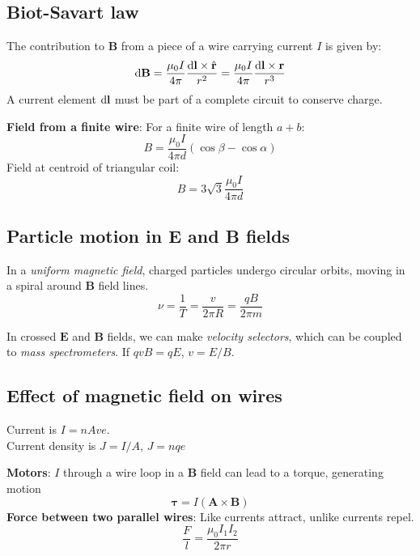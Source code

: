 \subsection*{Biot-Savart law}
The contribution to $\mathbf{B}$ from a piece of a wire carrying current $I$ is given by:
\begin{equation*}
    \differential \mathbf{B} = \frac{\mu_0 I}{4 \pi} \frac{\differential \mathbf{l} \times \hat{\mathbf{r}}}{r^2} = \frac{\mu_0 I}{4 \pi} \frac{\differential \mathbf{l} \times \mathbf{r}}{r^3}
\end{equation*}
A current element $\differential \mathbf{l}$ must be part of a complete circuit to conserve charge.

\textbf{Field from a finite wire}: For a finite wire of length $a+b$:
\begin{equation*}
    B = \frac{\mu_0 I}{4 \pi d}(\cos \beta - \cos \alpha)
\end{equation*}
Field at centroid of triangular coil:
\begin{equation*}
    B = 3\sqrt{3}\frac{\mu_0 I}{4 \pi d}
\end{equation*}
\subsection*{Particle motion in E and B fields}
In a \textit{uniform magnetic field}, charged particles undergo circular orbits, moving in a spiral around $\mathbf{B}$ field lines.
\begin{equation*}
    \nu = \frac{1}{T} = \frac{v}{2\pi R} = \frac{qB}{2 \pi m}
\end{equation*}

In crossed $\mathbf{E}$ and $\mathbf{B}$ fields, we can make \textit{velocity selectors}, which can be coupled to \textit{mass spectrometers}. If $qvB = qE$, $v = E/B$.

\subsection*{Effect of magnetic field on wires}
Current is $I = nAve$.\\
Current density is $J = I / A$, $J = nqe$

\textbf{Motors}: $I$ through a wire loop in a $\mathbf{B}$ field can lead to a torque, generating motion
\begin{equation*}
    \mathbf{\tau} = I(\mathbf{A} \times \mathbf{B})
\end{equation*}
\textbf{Force between two parallel wires}: Like currents attract, unlike currents repel.
\begin{equation*}
    \frac{F}{l} = \frac{\mu_0 I_1 I_2}{2 \pi r}
\end{equation*}
